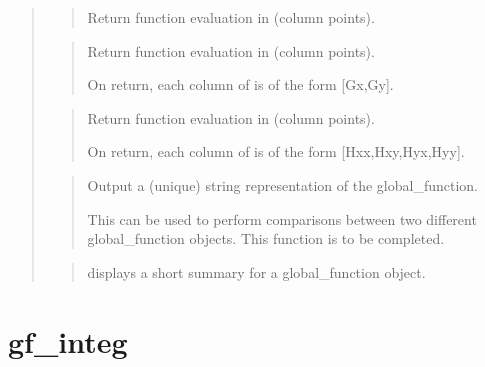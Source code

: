 \documentclass[a4paper,11pt,english]{sphinxmanual}
\begin{document}
\begin{quote}

\begin{quote}

Return  function evaluation in  (column points).
\end{quote}

\begin{quote}

Return  function evaluation in  (column points).

On return, each column of  is of the
form {[}Gx,Gy{]}.
\end{quote}

\begin{quote}

Return  function evaluation in  (column points).

On return, each column of  is of the
form {[}Hxx,Hxy,Hyx,Hyy{]}.
\end{quote}

\begin{quote}

Output a (unique) string representation of the global\_function.

This can be used to perform comparisons between two
different global\_function objects.
This function is to be completed.
\end{quote}

\begin{quote}

displays a short summary for a global\_function object.
\end{quote}
\end{quote}


\section{gf\_integ}
\label{\detokenize{matlab_octave/cmdref_gf_integ:gf-integ}}\label{\detokenize{matlab_octave/cmdref_gf_integ::doc}}
\end{document}
